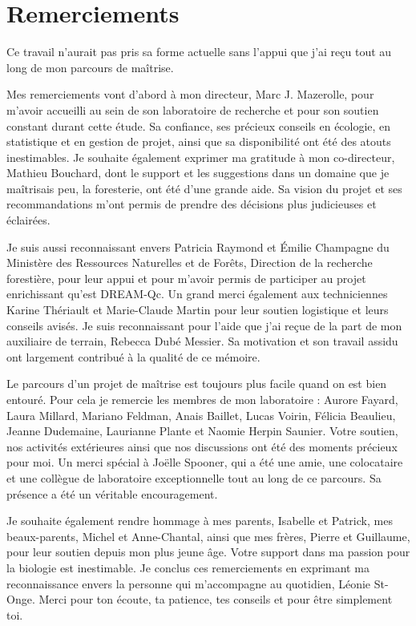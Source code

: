 \chapter*{Remerciements}        %
\label{chap-remerciements}      %


 Ce travail n'aurait pas pris sa forme actuelle sans l'appui que j'ai reçu tout au long de mon parcours de maîtrise.

 Mes remerciements vont d'abord à mon directeur, Marc J. Mazerolle, pour m'avoir accueilli au sein de son laboratoire de recherche et pour son soutien constant durant cette étude. 
 Sa confiance, ses précieux conseils en écologie, en statistique et en gestion de projet, ainsi que sa disponibilité ont été des atouts inestimables.
 Je souhaite également exprimer ma gratitude à mon co-directeur, Mathieu Bouchard, dont le support et les suggestions dans un domaine que je maîtrisais peu, la foresterie, ont été d'une grande aide. 
 Sa vision du projet et ses recommandations m'ont permis de prendre des décisions plus judicieuses et éclairées.

 Je suis aussi reconnaissant envers Patricia Raymond et Émilie Champagne du Ministère des Ressources Naturelles et de Forêts, Direction de la recherche forestière, pour leur appui et 
 pour m'avoir permis de participer au projet enrichissant qu'est DREAM-Qc.
 Un grand merci également aux techniciennes Karine Thériault et Marie-Claude Martin pour leur soutien logistique et leurs conseils avisés.
 Je suis reconnaissant pour l'aide que j'ai reçue de la part de mon auxiliaire de terrain, Rebecca Dubé Messier. Sa motivation et son travail assidu ont largement contribué à la qualité de ce mémoire.

 Le parcours d'un projet de maîtrise est toujours plus facile quand on est bien entouré. 
 Pour cela je remercie les membres de mon laboratoire : 
 Aurore Fayard, Laura Millard, Mariano Feldman, Anais Baillet, Lucas Voirin, Félicia Beaulieu, Jeanne Dudemaine, Laurianne Plante et Naomie Herpin Saunier. 
 Votre soutien, nos activités extérieures ainsi que nos discussions ont été des moments précieux pour moi.
 Un merci spécial à Joëlle Spooner, qui a été une amie, une colocataire et une collègue de laboratoire exceptionnelle tout au long de ce parcours. 
 Sa présence a été un véritable encouragement.

 Je souhaite également rendre hommage à mes parents, Isabelle et Patrick, mes beaux-parents, Michel et Anne-Chantal, ainsi que mes frères, Pierre et Guillaume, pour leur soutien depuis 
 mon plus jeune âge. Votre support dans ma passion pour la biologie est inestimable.
 Je conclus ces remerciements en exprimant ma reconnaissance envers la personne qui m'accompagne au quotidien, Léonie St-Onge. 
 Merci pour ton écoute, ta patience, tes conseils et pour être simplement toi.

